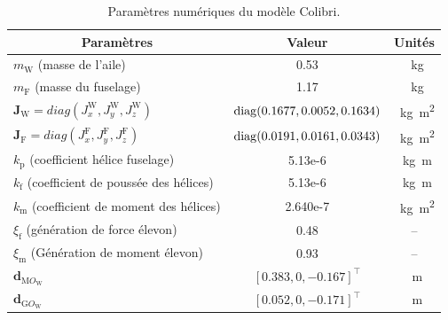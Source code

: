 \begin{table}[ht]
  \centering
    \begin{tabular}{|l|c|c|}
      \hline
      \multicolumn{1}{|c|}{Paramètres} & Valeur & Unités  \\
      \hline
      $m_{\text{W}}$ (masse de l'aile)  & 0.53& \SI{}{\kilogram} \\
      \hline
      $m_{\text{F}}$ (masse du fuselage)  & 1.17& \SI{}{\kilogram} \\
      \hline
      $\boldsymbol{J}_{\text{W}}=diag(J_{x}^{\text{W}}, J_{y}^{\text{W}}, J_{z}^{\text{W}})$ & \!\! $\operatorname{diag}(0.1677,0.0052,0.1634)$\!\! & \SI{}{\kilogram\square\meter}\\
      \hline
      $\boldsymbol{J}_{\text{F}}=diag(J_{x}^{\text{F}}, J_{y}^{\text{F}}, J_{z}^{\text{F}})$ & \!\! $\operatorname{diag}(0.0191,0.0161,0.0343)$\!\! & \SI{}{\kilogram\square\meter}\\
      \hline
      $k_{\text{p}}$ (coefficient hélice fuselage) & 5.13e-6 & \SI{}{\kilogram\meter}\\
      \hline
      $k_{\text{f}}$ (coefficient de poussée des hélices) & 5.13e-6 & \SI{}{\kilogram\meter}\\
      \hline
      $k_{\text{m}}$ (coefficient de moment des hélices) & 2.640e-7 & \SI{}{\kilogram\square\meter}\\
      \hline
      $\xi_{\text{f}}$ (génération de force élevon) & 0.48 & --\\
      \hline
      $\xi_{\text{m}}$ (Génération de moment élevon) & 0.93 & --\\
      \hline
       $\boldsymbol{d}_{\text{M}O_{\text{W}}}$  & $[0.383,0,-0.167]^\top$ & \SI{}{\meter}\\
      \hline
       $\boldsymbol{d}_{\text{G}O_{\text{W}}}$  & $[0.052,0,-0.171]^\top$ & \SI{}{\meter}\\
      \hline
    \end{tabular}
    \caption{Paramètres numériques du modèle Colibri.}
    \label{tab:pars_colibri}
\end{table}


